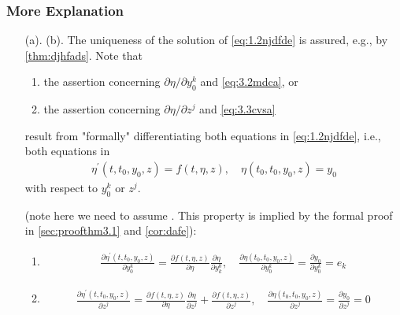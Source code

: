 \documentclass{article}
\begin{document}
\subsubsection{More Explanation}
\begin{enumerate}
    \item[(a). (b).] The uniqueness of the solution of \cref{eq:1.2njdfde} is assured, e.g., by \cref{thm:djhfads}. Note that \begin{enumerate}%
        \item the assertion concerning $\partial \eta / \partial y_{0}^{k}$ and \cref{eq:3.2mdca}, or
        \item the assertion concerning  $\partial \eta / \partial z^{j}$ and \cref{eq:3.3cvsa}
    \end{enumerate} result from "formally" differentiating both equations in \cref{eq:1.2njdfde}, i.e., both equations in
\begin{align*}
\eta^{\prime}\left(t, t_{0}, y_{0}, z\right)=f(t, \eta, z), \quad \eta\left(t_{0}, t_{0}, y_{0}, z\right)=y_{0}
\end{align*}
with respect to $y_{0}^{k}$ or $z^{j}$.

(note here we need to assume . This property is implied by  the formal proof in \cref{sec:proofthm3.1} and  \cref{cor:dafe}):

\begin{enumerate}
    \item \begin{align*}
\frac{\partial \eta^{\prime}\left(t, t_{0}, y_{0}, z\right)}{\partial y_0^k}=\frac{\partial f(t, \eta, z)}{\partial \eta}\frac{\partial \eta}{\partial y^0_k}, \quad \frac{\partial \eta\left(t_{0}, t_{0}, y_{0}, z\right)}{\partial y_0^k}=\frac{\partial y_{0}}{\partial y_0^k}=e_k
\end{align*}
\item \begin{align*}
\frac{\partial \eta^{\prime}\left(t, t_{0}, y_{0}, z\right)}{\partial z^j}=\frac{\partial f(t, \eta, z)}{\partial \eta}\frac{\partial \eta}{\partial z^j}+\frac{\partial f(t, \eta, z)}{\partial z^j}, \quad \frac{\partial \eta\left(t_{0}, t_{0}, y_{0}, z\right)}{\partial z^j}=\frac{\partial y_{0}}{\partial z^j}=0
\end{align*}
\end{enumerate}


\end{enumerate}
\end{document}
